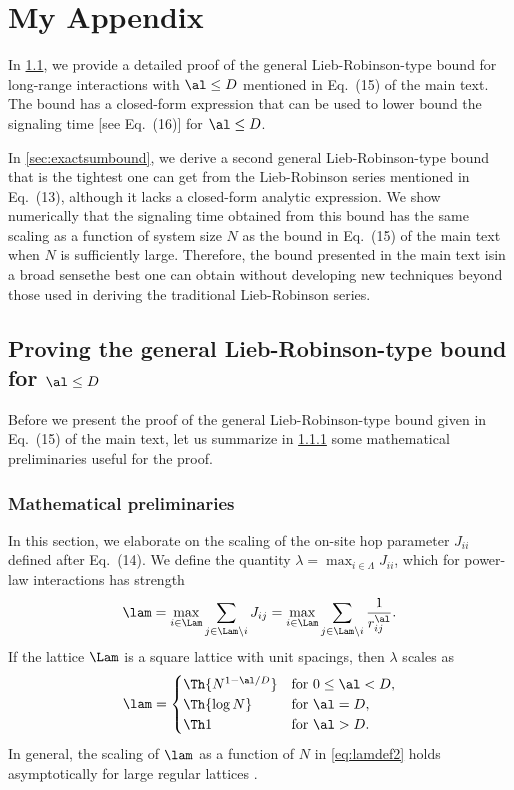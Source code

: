 \chapter{My Appendix}

In \cref{sec:generalbound}, we provide a detailed proof of the general Lieb-Robinson-type bound for long-range interactions with $\al\le D$ mentioned in Eq.~(15) of the main text. The bound has a closed-form expression that can be used to lower bound the signaling time [see Eq.~(16)] for $\al \le D$.

In \cref{sec:exactsumbound}, we derive a second general Lieb-Robinson-type bound that is the tightest one can get from the Lieb-Robinson series mentioned in Eq.~(13), although it lacks a closed-form analytic expression.
We show numerically that the signaling time obtained from this bound has the same scaling as a function of system size $N$ as the bound in Eq.~(15) of the main text when $N$ is sufficiently large.
Therefore, the bound presented in the main text is\dash in a broad sense\dash the best one can obtain without developing new techniques beyond those used in deriving the traditional Lieb-Robinson series.

\section{Proving the general Lieb-Robinson-type bound for $\al \le D$}
\label{sec:generalbound}
Before we present the proof of the general Lieb-Robinson-type bound given in Eq.~(15) of the main text, let us summarize in \cref{sec:math} some mathematical preliminaries useful for the proof.

\subsection{Mathematical preliminaries}
\label{sec:math}
In this section, we elaborate on the scaling of the on-site hop parameter $J_{ii}$ defined after Eq.~(14).
We define the quantity $\lambda = \max_{i\in\Lambda} J_{ii}$, which for power-law interactions has strength
\begin{equation}
	\label{eq:self-hop}
	\lam = \max_{i\in\Lam} \sum_{j\in\Lam\backslash i} J_{ij} = \max_{i\in\Lam}\sum_{j\in\Lam\backslash i} \frac{1}{r_{ij}^{\al}}.
\end{equation}
If the lattice $\Lam$ is a square lattice with unit spacings, then $\lambda$ scales as
\begin{equation}
        \label{eq:lamdef2}
	\lam = \begin{cases}
        \Th{N^{1-\al/D}} & \text{for }0\le\al<D,\\
        \Th{\log N} & \text{for }\al=D,\\
        \Th 1 & \text{for }\al>D.
\end{cases}
\end{equation}
In general, the scaling of $\lam$ as a function of $N$ in \cref{eq:lamdef2} holds asymptotically for large regular lattices \cite{Storch15}.


